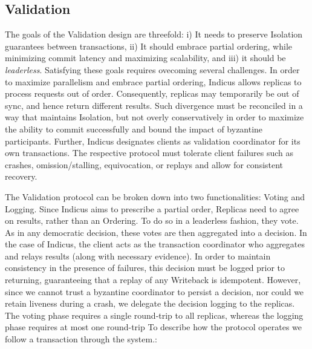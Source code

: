 \subsection{Validation}
The goals of the Validation design are threefold: i) It needs to preserve Isolation guarantees between transactions, ii) It should embrace partial ordering, while minimizing commit latency and  maximizing scalability, and iii) it should be \textit{leaderless}. Satisfying these goals requires ovecoming several challenges. In order to maximize parallelism and embrace partial ordering, Indicus allows replicas to process requests out of order. Consequently, replicas may temporarily be out of sync, and hence return different results. Such divergence must be reconciled in a way that maintains Isolation, but not overly conservatively in order to maximize the ability to commit successfully and bound the impact of byzantine participants. Further, Indicus designates clients as validation coordinator for its own transactions. The respective protocol must tolerate client failures such as crashes, omission/stalling, equivocation, or replays and allow for consistent recovery. 

The Validation protocol can be broken down into two functionalities: Voting and Logging.
Since Indicus aims to prescribe a partial order, Replicas need to agree on results, rather than an Ordering. To do so in a leaderless fashion, they vote. As in any democratic decision, these votes are then aggregated into a decision. In the case of Indicus, the client acts as the transaction coordinator who aggregates and relays results (along with necessary evidence).
 In order to maintain consistency in the presence of failures, this decision must be logged prior to returning, guaranteeing that a replay of any Writeback is idempotent.  However, since we cannot trust a byzantine coordinator to persist a decision, nor could we retain liveness during a crash, we delegate the decision logging to the replicas.
The voting phase requires a single round-trip to all replicas, whereas the logging phase requires at most one round-trip 
To describe how the protocol operates we follow a transaction through the system.:


